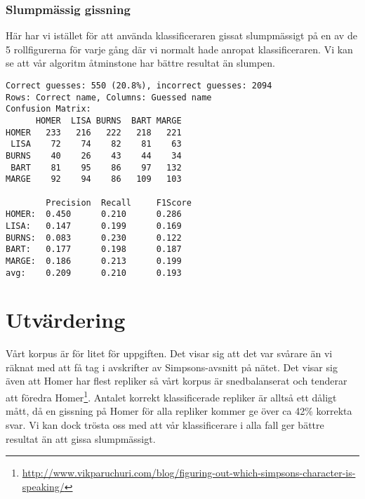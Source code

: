 \documentclass[a4paper]{article}
\begin{document}
\subsubsection{Slumpmässig gissning}
Här har vi istället för att använda klassificeraren gissat slumpmässigt på en av
de 5 rollfigurerna för varje gång där vi normalt hade anropat klassificeraren.
Vi kan se att vår algoritm åtminstone har bättre resultat än slumpen.
\begin{verbatim}
Correct guesses: 550 (20.8%), incorrect guesses: 2094
Rows: Correct name, Columns: Guessed name
Confusion Matrix:
      HOMER  LISA BURNS  BART MARGE 
HOMER   233   216   222   218   221 
 LISA    72    74    82    81    63 
BURNS    40    26    43    44    34 
 BART    81    95    86    97   132 
MARGE    92    94    86   109   103 

        Precision  Recall     F1Score    
HOMER:  0.450      0.210      0.286      
LISA:   0.147      0.199      0.169      
BURNS:  0.083      0.230      0.122      
BART:   0.177      0.198      0.187      
MARGE:  0.186      0.213      0.199      
avg:    0.209      0.210      0.193      
\end{verbatim}


\section{Utvärdering}
Vårt korpus är för litet för uppgiften. Det visar sig att det var svårare än vi
räknat med att få tag i avskrifter av Simpsons-avsnitt på nätet. Det visar sig
även att Homer har flest repliker så vårt korpus är snedbalanserat och tenderar
att föredra
Homer\footnote{\url{http://www.vikparuchuri.com/blog/figuring-out-which-simpsons-character-is-speaking/}}.
Antalet korrekt klassificerade repliker är alltså ett dåligt mått, då en
gissning på Homer för alla repliker kommer ge över ca 42\% korrekta svar. Vi kan
dock trösta oss med att vår klassificerare i alla fall ger bättre resultat än
att gissa slumpmässigt.


\end{document}
